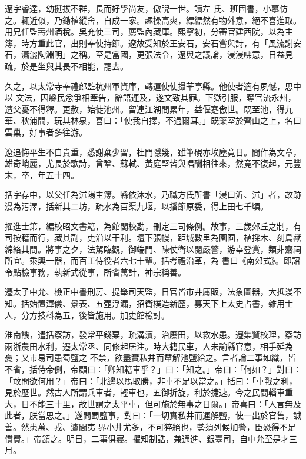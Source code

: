 \begin{pinyinscope}
 遼字睿達，幼挺拔不群，長而好學尚友，傲睨一世。讀左
 氏、班固書，小摹仿之。輒近似，乃鋤植縱舍，自成一家。趣操高爽，縹縹然有物外意，絕不喜進取。用兄任監壽州酒稅。吳充使三司，薦監內藏庫。熙寧初，分審官建西院，以為主簿，時方重此官，出則奉使持節。遼故受知於王安石，安石嘗與詩，有「風流謝安石，瀟灑陶淵明」之稱。至是當國，更張法令，遼與之議論，浸浸咈意，日益見疏，於是坐與其長不相能，罷去。



 久之，以太常寺奉禮郎監杭州軍資庫，轉運使使攝華亭縣。他使者適有夙憾，思中以
 文法，因縣民忿爭相牽告，辭語連及，遂文致其罪。下獄引服，奪官流永州，遭父憂不得釋。更赦，始徙池州。留連江湖間累年，益偃蹇傲世。既至池，得九華、秋浦間，玩其林泉，喜曰：「使我自擇，不過爾耳。」既築室於齊山之上，名曰雲巢，好事者多往游。



 遼追悔平生不自貴重，悉謝棄少習，杜門隱幾，雖筆硯亦埃塵竟日。間作為文章，雄奇峭麗，尤長於歌詩，曾鞏、蘇軾、黃庭堅皆與唱酬相往來，然竟不復起，元豐末，卒，年五十四。



 括字存中，以父任為沭陽主簿。縣依沐水，乃職方氏所書「浸曰沂、沭」者，故跡漫為污澤，括新其二坊，疏水為百渠九堰，以播節原委，得上田七千頃。



 擢進士第，編校昭文書籍，為館閣校勘，刪定三司條例。故事，三歲郊丘之制，有司按籍而行，藏其副，吏沿以干利。壇下張幔，距城數里為園囿，植採木、刻鳥獸綿絡其間。將事之夕，法駕臨觀，御端門、陳仗衛以閱嚴警，游幸登賞，類非齋祠所宜。乘輿一器，而百工侍役者六七十輩。括考禮沿革，為
 書曰《南郊式》。即詔令點檢事務，執新式從事，所省萬計，神宗稱善。



 遷太子中允、檢正中書刑房、提舉司天監，日官皆市井庸販，法象圖器，大抵漫不知。括始置渾儀、景表、五壺浮漏，招衛樸造新歷，募天下上太史占書，雜用士人，分方技科為五，後皆施用。加史館檢討。



 淮南饑，遣括察訪，發常平錢粟，疏溝瀆，治廢田，以救水患。遷集賢校理，察訪兩浙農田水利，遷太常丞、同修起居注。時大籍民車，人未諭縣官意，相手延為憂；又市易司患蜀鹽之
 不禁，欲盡實私井而輦解池鹽給之。言者論二事如織，皆不省，括侍帝側，帝顧曰：「卿知籍車乎？」曰：「知之。」帝曰：「何如？」對曰：「敢問欲何用？」帝曰：「北邊以馬取勝，非車不足以當之。」括曰：「車戰之利，見於歷世。然古人所謂兵車者，輕車也，五御折旋，利於捷速。今之民間輜車重大，日不能三十里，故世謂之太平車，但可施於無事之日爾。」帝喜曰：「人言無及此者，朕當思之。」遂問蜀鹽事，對曰：「一切實私井而運解鹽，使一出於官售，誠善。然患萬、戎、瀘間夷
 界小井尤多，不可猝絕也，勢須列候加警，臣恐得不足償費。」帝頷之。明日，二事俱寢。擢知制誥，兼通進、銀臺司，自中允至是才三月。




\end{pinyinscope}
